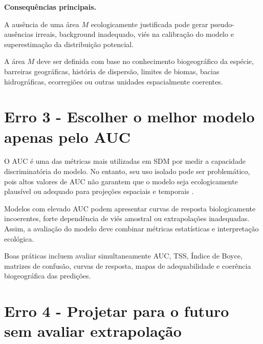 \documentclass{ueap-sdm}
\begin{document}
\begin{sdmwarningbox}
	\textbf{Consequências principais.}
	
	A ausência de uma área $M$ ecologicamente justificada pode gerar
	pseudo-ausências irreais, background inadequado, viés na calibração do modelo
	e superestimação da distribuição potencial.
\end{sdmwarningbox}

A área $M$ deve ser definida com base no conhecimento biogeográfico da espécie,
barreiras geográficas, história de dispersão, limites de biomas, bacias
hidrográficas, ecorregiões ou outras unidades espacialmente coerentes.

\section{Erro 3 - Escolher o melhor modelo apenas pelo AUC}

O AUC é uma das métricas mais utilizadas em SDM por medir a capacidade
discriminatória do modelo. No entanto, seu uso isolado pode ser problemático,
pois altos valores de AUC não garantem que o modelo seja ecologicamente
plausível ou adequado para projeções espaciais e temporais
\citep{lobo2008auc, allouche2006assessing}.

Modelos com elevado AUC podem apresentar curvas de resposta biologicamente
incoerentes, forte dependência de viés amostral ou extrapolações inadequadas.
Assim, a avaliação do modelo deve combinar métricas estatísticas e interpretação
ecológica.

\begin{center}
\end{center}

Boas práticas incluem avaliar simultaneamente AUC, TSS, Índice de Boyce,
matrizes de confusão, curvas de resposta, mapas de adequabilidade e coerência
biogeográfica das predições.

\section{Erro 4 - Projetar para o futuro sem avaliar extrapolação}
\end{document}
